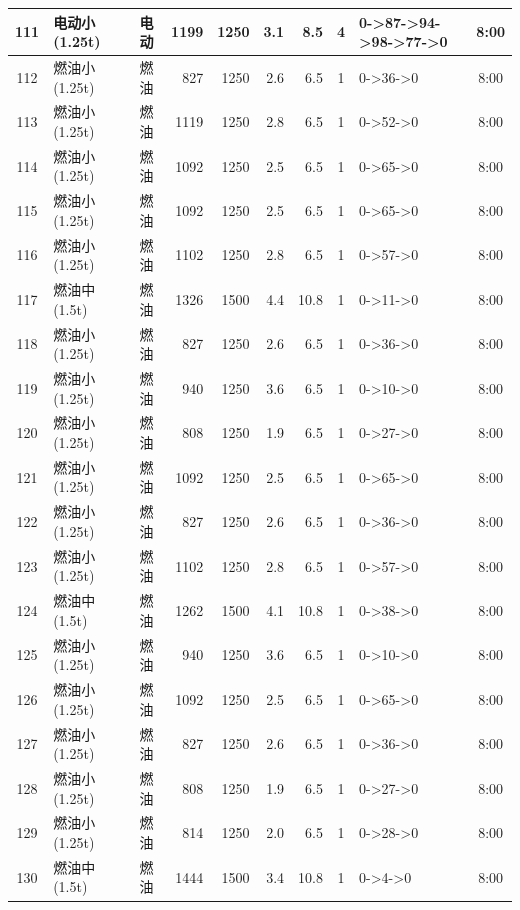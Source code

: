 \begin{landscape}
\begin{longtable}{|c|l|c|r|r|r|r|c|p{2.8cm}|c|}
\hline
\rowcolor{gray!8}
111 & 电动小(1.25t) & 电动 & 1199 & 1250 & 3.1 & 8.5 & 4 & 0->87->94->98->77->0 & 8:00 \\
\hline
112 & 燃油小(1.25t) & 燃油 & 827 & 1250 & 2.6 & 6.5 & 1 & 0->36->0 & 8:00 \\
\hline
\rowcolor{gray!8}
113 & 燃油小(1.25t) & 燃油 & 1119 & 1250 & 2.8 & 6.5 & 1 & 0->52->0 & 8:00 \\
\hline
114 & 燃油小(1.25t) & 燃油 & 1092 & 1250 & 2.5 & 6.5 & 1 & 0->65->0 & 8:00 \\
\hline
\rowcolor{gray!8}
115 & 燃油小(1.25t) & 燃油 & 1092 & 1250 & 2.5 & 6.5 & 1 & 0->65->0 & 8:00 \\
\hline
116 & 燃油小(1.25t) & 燃油 & 1102 & 1250 & 2.8 & 6.5 & 1 & 0->57->0 & 8:00 \\
\hline
\rowcolor{gray!8}
117 & 燃油中(1.5t) & 燃油 & 1326 & 1500 & 4.4 & 10.8 & 1 & 0->11->0 & 8:00 \\
\hline
118 & 燃油小(1.25t) & 燃油 & 827 & 1250 & 2.6 & 6.5 & 1 & 0->36->0 & 8:00 \\
\hline
\rowcolor{gray!8}
119 & 燃油小(1.25t) & 燃油 & 940 & 1250 & 3.6 & 6.5 & 1 & 0->10->0 & 8:00 \\
\hline
120 & 燃油小(1.25t) & 燃油 & 808 & 1250 & 1.9 & 6.5 & 1 & 0->27->0 & 8:00 \\
\hline
\rowcolor{gray!8}
121 & 燃油小(1.25t) & 燃油 & 1092 & 1250 & 2.5 & 6.5 & 1 & 0->65->0 & 8:00 \\
\hline
122 & 燃油小(1.25t) & 燃油 & 827 & 1250 & 2.6 & 6.5 & 1 & 0->36->0 & 8:00 \\
\hline
\rowcolor{gray!8}
123 & 燃油小(1.25t) & 燃油 & 1102 & 1250 & 2.8 & 6.5 & 1 & 0->57->0 & 8:00 \\
\hline
124 & 燃油中(1.5t) & 燃油 & 1262 & 1500 & 4.1 & 10.8 & 1 & 0->38->0 & 8:00 \\
\hline
\rowcolor{gray!8}
125 & 燃油小(1.25t) & 燃油 & 940 & 1250 & 3.6 & 6.5 & 1 & 0->10->0 & 8:00 \\
\hline
126 & 燃油小(1.25t) & 燃油 & 1092 & 1250 & 2.5 & 6.5 & 1 & 0->65->0 & 8:00 \\
\hline
\rowcolor{gray!8}
127 & 燃油小(1.25t) & 燃油 & 827 & 1250 & 2.6 & 6.5 & 1 & 0->36->0 & 8:00 \\
\hline
128 & 燃油小(1.25t) & 燃油 & 808 & 1250 & 1.9 & 6.5 & 1 & 0->27->0 & 8:00 \\
\hline
\rowcolor{gray!8}
129 & 燃油小(1.25t) & 燃油 & 814 & 1250 & 2.0 & 6.5 & 1 & 0->28->0 & 8:00 \\
\hline
130 & 燃油中(1.5t) & 燃油 & 1444 & 1500 & 3.4 & 10.8 & 1 & 0->4->0 & 8:00 \\

\end{longtable}
\end{landscape}

